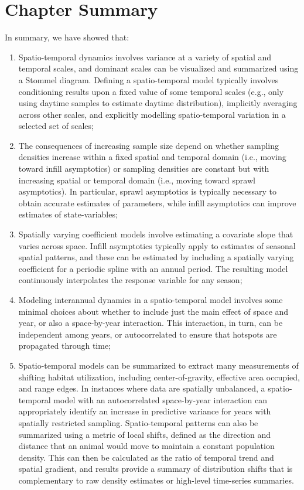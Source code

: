 \section{Chapter Summary}

In summary, we have showed that:
\begin{enumerate}
    \item Spatio-temporal dynamics involves variance at a variety of spatial and temporal scales, and dominant scales can be visualized and summarized using a Stommel diagram.  Defining a spatio-temporal model typically involves conditioning results upon a fixed value of some temporal scales (e.g., only using daytime samples to estimate daytime distribution), implicitly averaging across other scales, and explicitly modelling spatio-temporal variation in a selected set of scales;
    
    \item The consequences of increasing sample size depend on whether sampling densities increase within a fixed spatial and temporal domain (i.e., moving toward infill asymptotics) or sampling densities are constant but with increasing spatial or temporal domain (i.e., moving toward sprawl asymptotics).  In particular, sprawl asymptotics is typically necessary to obtain accurate estimates of parameters, while infill asymptotics can improve estimates of state-variables;  
 
    \item Spatially varying coefficient models involve estimating a covariate slope that varies across space.  Infill asymptotics typically apply to estimates of seasonal spatial patterns, and these can be estimated by including a spatially varying coefficient for a periodic spline with an annual period.  The resulting model continuously interpolates the response variable for any season;  

    \item Modeling interannual dynamics in a spatio-temporal model involves some minimal choices about whether to include just the main effect of space and year, or also a space-by-year interaction.  This interaction, in turn, can be independent among years, or autocorrelated to ensure that hotspots are propagated through time;  
 
    \item Spatio-temporal models can be summarized to extract many measurements of shifting habitat utilization, including center-of-gravity, effective area occupied, and range edges. In instances where data are spatially unbalanced, a spatio-temporal model with an autocorrelated space-by-year interaction can appropriately identify an increase in predictive variance for years with spatially restricted sampling.  Spatio-temporal patterns can also be summarized using a metric of local shifts, defined as the direction and distance that an animal would move to maintain a constant population density.  This can then be calculated as the ratio of temporal trend and spatial gradient, and results provide a summary of distribution shifts that is complementary to raw density estimates or high-level time-series summaries.  
\end{enumerate}

